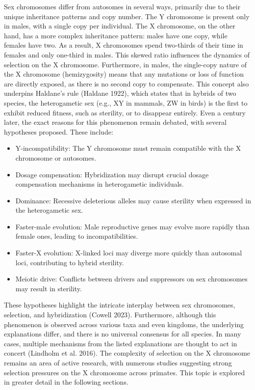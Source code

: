 \documentclass[
  11pt,
  a4paper,
]{scrbook}
\providecommand{\tightlist}{%
  \setlength{\itemsep}{0pt}\setlength{\parskip}{0pt}}
\begin{document}
Sex chromosomes differ from autosomes in several ways, primarily due to
their unique inheritance patterns and copy number. The Y chromosome is
present only in males, with a single copy per individual. The X
chromosome, on the other hand, has a more complex inheritance pattern:
males have one copy, while females have two. As a result, X chromosomes
spend two-thirds of their time in females and only one-third in males.
This skewed ratio influences the dynamics of selection on the X
chromosome. Furthermore, in males, the single-copy nature of the X
chromosome (hemizygosity) means that any mutations or loss of function
are directly exposed, as there is no second copy to compensate. This
concept also underpins Haldane's rule (Haldane 1922), which states that
in hybrids of two species, the heterogametic sex (e.g., XY in mammals,
ZW in birds) is the first to exhibit reduced fitness, such as sterility,
or to disappear entirely. Even a century later, the exact reasons for
this phenomenon remain debated, with several hypotheses proposed. These
include:

\begin{itemize}
\tightlist
\item
  Y-incompatibility: The Y chromosome must remain compatible with the X
  chromosome or autosomes.
\item
  Dosage compensation: Hybridization may disrupt crucial dosage
  compensation mechanisms in heterogametic individuals.
\item
  Dominance: Recessive deleterious alleles may cause sterility when
  expressed in the heterogametic sex.
\item
  Faster-male evolution: Male reproductive genes may evolve more rapidly
  than female ones, leading to incompatibilities.
\item
  Faster-X evolution: X-linked loci may diverge more quickly than
  autosomal loci, contributing to hybrid sterility.
\item
  Meiotic drive: Conflicts between drivers and suppressors on sex
  chromosomes may result in sterility.
\end{itemize}

These hypotheses highlight the intricate interplay between sex
chromosomes, selection, and hybridization (Cowell 2023). Furthermore,
although this phenomenon is observed across various taxa and even
kingdoms, the underlying explanations differ, and there is no universal
consensus for all species. In many cases, multiple mechanisms from the
listed explanations are thought to act in concert (Lindholm et al.
2016). The complexity of selection on the X chromosome remains an area
of active research, with numerous studies suggesting strong selection
pressures on the X chromosome across primates. This topic is explored in
greater detail in the following sections.
\end{document}
